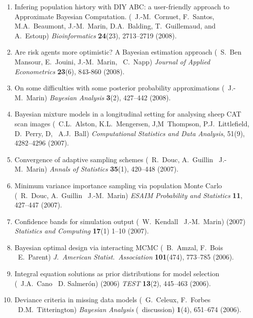 \begin{enumerate}
\item Infering population history with DIY ABC: a user-friendly approach to Approximate Bayesian Computation. 
(\avec\ J.-M.~Cornuet, F.~Santos, M.A.~Beaumont, J.-M.~Marin, D.A.~Balding, T.~Guillemaud, and A.~Estoup)
{\em Bioinformatics} {\bf 24}(23), 2713--2719 (2008).

\item Are risk agents more optimistic? A Bayesian estimation approach (\avec\
S.~Ben Mansour, E.~Jouini, J.-M.~Marin, \et\ C.~Napp)
{\em Journal of Applied Econometrics} {\bf 23}(6), 843-860 (2008).

\item On some difficulties with some posterior probability approximations (\avec\ J.-M.~Marin)
{\em Bayesian Analysis} {\bf 3}(2), 427--442 (2008).

\item Bayesian mixture models in a longitudinal setting for analysing sheep CAT scan images (\avec\ C.L.~Alston, 
K.L.~Mengersen, J,M~Thompson, P.J.~Littlefield, D.~Perry, D, \et\ A.J.~Ball)
{\em Computational Statistics and Data Analysis}, 51(9), 4282--4296 (2007).

\item Convergence of adaptive sampling schemes (\avec\ R.~Douc, A.~Guillin \et\ J.-M.~Marin) 
{\it Annals of Statistics} {\bf 35}(1), 420--448 (2007).

\item Minimum variance importance sampling via population Monte Carlo
(\avec\ R.~Douc, A.~Guillin \et\ J.-M.~Marin) {\em ESAIM Probability and Statistics}
{\bf 11}, 427--447 (2007).

\item Confidence bands for simulation output (\avec\ W.~Kendall \et\ J.-M.~Marin) (2007)
{\it Statistics and Computing} {\bf 17}(1) 1--10 (2007).

\item Bayesian optimal design via interacting MCMC (\avec\ B.~Amzal, F.~Bois \et\ E.~Parent)
{\em J.~American Statist.~Association} {\bf 101}(474), 773--785 (2006).

\item Integral equation solutions as prior distributions for model selection 
(\avec\ J.A.~Cano \et\ D. Salmer\'on) (2006) {\it TEST} {\bf 13}(2), 445--463 (2006).

\item Deviance criteria in missing data models
(\avec\ G.~Celeux, F.~Forbes \et\ D.M.~Titterington)
{\it Bayesian Analysis} (\avec\ discussion) {\bf 1}(4), 651--674 (2006).


\end{enumerate}
